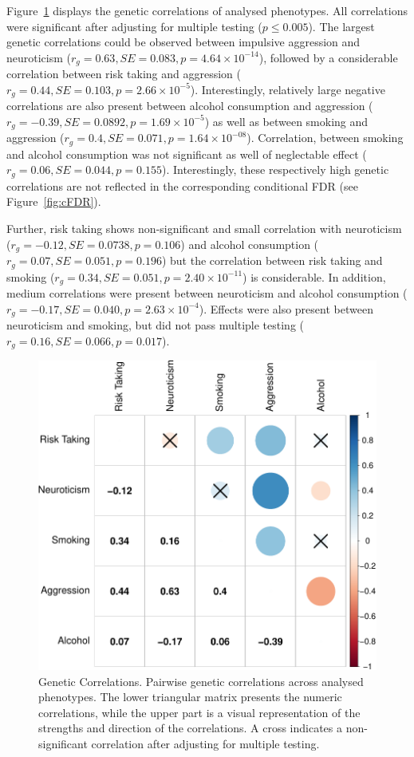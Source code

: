 Figure~\ref{fig:gcor} displays the genetic correlations of analysed phenotypes.
All correlations were significant after adjusting for multiple testing ($p\leq0.005$).
The largest genetic correlations could be observed between impulsive aggression and neuroticism ($r_g=0.63, SE=0.083, p=4.64\times 10^{-14}$), 
followed by a considerable correlation between risk taking and aggression ($r_g=0.44, SE=0.103, p=2.66\times 10^{-5}$).
Interestingly, relatively large negative correlations are also present between alcohol consumption and aggression ($r_g=-0.39, SE=0.0892, p=1.69\times 10^{-5}$)
as well as between smoking and aggression ($r_g=0.4, SE=0.071, p=1.64\times 10^{-08}$).
Correlation, between smoking and alcohol consumption was not significant as well of neglectable effect ($r_g=0.06, SE=0.044, p=0.155$).
Interestingly, these respectively high genetic correlations are not reflected in the corresponding conditional FDR (see Figure~\ref{fig:cFDR}).

Further, risk taking shows non-significant and small correlation with neuroticism ($r_g=-0.12, SE=0.0738, p=0.106$) and
alcohol consumption ($r_g=0.07, SE=0.051, p=0.196$) but the correlation between risk taking and smoking ($r_g=0.34, SE=0.051, p=2.40\times 10^{-11}$) is considerable.
In addition, medium correlations were present between neuroticism and alcohol consumption ($r_g=-0.17, SE=0.040, p=2.63\times 10^{-4}$). 
Effects were also present between neuroticism and smoking, but did not pass multiple testing ($r_g=0.16, SE=0.066, p=0.017$).

\begin{figure}[!h]
	\centering
  \includegraphics[width=0.8\linewidth]{ukb_assoc/figure/genetic_corr/gcorr_plot_circle_full_se.pdf}
  \caption{Genetic Correlations.
    Pairwise genetic correlations across analysed phenotypes.
    The lower triangular matrix presents the numeric correlations, while the upper part is a visual representation of the strengths and direction of the correlations.
    A cross indicates a non-significant correlation after adjusting for multiple testing.
  }\label{fig:gcor}
\end{figure}
